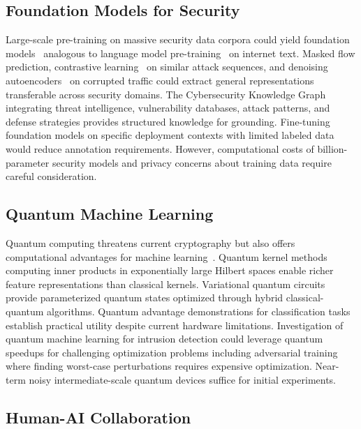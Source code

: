 \subsection*{Foundation Models for Security}

Large-scale pre-training on massive security data corpora could yield foundation models~\cite{bommasani2021opportunities} analogous to language model pre-training~\cite{devlin2019bert,brown2020language} on internet text. Masked flow prediction, contrastive learning~\cite{chen2020simple} on similar attack sequences, and denoising autoencoders~\cite{vincent2008extracting} on corrupted traffic could extract general representations transferable across security domains. The Cybersecurity Knowledge Graph integrating threat intelligence, vulnerability databases, attack patterns, and defense strategies provides structured knowledge for grounding. Fine-tuning foundation models on specific deployment contexts with limited labeled data would reduce annotation requirements. However, computational costs of billion-parameter security models and privacy concerns about training data require careful consideration.

\subsection*{Quantum Machine Learning}

Quantum computing threatens current cryptography but also offers computational advantages for machine learning~\cite{biamonte2017quantum}. Quantum kernel methods~\cite{havlicek2019supervised} computing inner products in exponentially large Hilbert spaces enable richer feature representations than classical kernels. Variational quantum circuits~\cite{mcclean2016theory} provide parameterized quantum states optimized through hybrid classical-quantum algorithms. Quantum advantage demonstrations for classification tasks establish practical utility despite current hardware limitations. Investigation of quantum machine learning for intrusion detection could leverage quantum speedups for challenging optimization problems including adversarial training where finding worst-case perturbations requires expensive optimization. Near-term noisy intermediate-scale quantum devices suffice for initial experiments.

\subsection*{Human-AI Collaboration}

